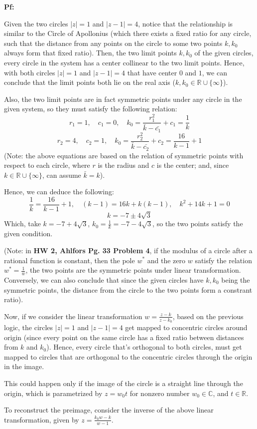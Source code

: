\documentclass{article}
\begin{document}
\textbf{Pf:}

Given the two circles $|z|=1$ and $|z-1|=4$, notice that the relationship is similar to the Circle of Apollonius 
(which there exists a fixed ratio for any circle, such that the distance from any points on the circle to some two points $k,k_0$ always form that fixed ratio).
Then, the two limit points $k,k_0$ of the given circles, every circle in the system has a center collinear to the two limit points.
Hence, with both circles $|z|=1$ and $|z-1|=4$ that have center $0$ and $1$, we can conclude that the limit points both lie on the real axis ($k,k_0\in\mathbb{R}\cup\{\infty\}$).

\hfill

Also, the two limit points are in fact symmetric points under any circle in the given system, so they must satisfy the following relation:
$$r_1=1,\quad c_1=0,\quad k_0=\frac{r_1^2}{\bar{k}-\bar{c_1}}+c_1 = \frac{1}{k}$$
$$r_2=4,\quad c_2=1,\quad k_0=\frac{r_2^2}{\bar{k}-\bar{c_2}}+c_2=\frac{16}{k-1}+1$$
(Note: the above equations are based on the relation of symmetric points with respect to each circle, where $r$ is the radius and $c$ is the center; and, since $k\in\mathbb{R}\cup\{\infty\}$, can assume $\bar{k}=k$).

Hence, we can deduce the following:
$$\frac{1}{k}=\frac{16}{k-1}+1,\quad (k-1)=16k+k(k-1),\quad k^2+14k+1=0$$
$$k=-7\pm 4\sqrt{3}$$
Which, take $k=-7+4\sqrt{3}$, $k_0=\frac{1}{k}=-7-4\sqrt{3}$, so the two points satisfy the given condition.

(Note: in \textbf{HW 2, Ahlfors Pg. 33 Problem 4}, if the modulus of a circle after a rational function is constant,
then the pole $w^*$ and the zero $w$ satisfy the relation $w^*=\frac{1}{\bar{w}}$, the two points are the symmetric points under linear transformation.
Conversely, we can also conclude that since the given circles have $k,k_0$ being the symmetric points, the distance from the circle to the two points form a constrant ratio).

\hfill

Now, if we consider the linear transformation $w=\frac{z-k}{z-k_0}$, based on the previous logic, 
the circles $|z|=1$ and $|z-1|=4$ get mapped to concentric circles around origin (since every point on the same circle has a fixed ratio between distances from $k$ and $k_0$).
Hence, every circle that's orthogonal to both circles, must get mapped to circles that are orthogonal to the concentric circles through the origin in the image.

This could happen only if the image of the circle is a straight line through the origin, which is parametrized by $z=w_0t$ for nonzero number $w_0\in\mathbb{C}$, and $t\in\mathbb{R}$.

To reconstruct the preimage, consider the inverse of the above linear transformation, given by $z=\frac{k_0w-k}{w-1}$.
\end{document}

